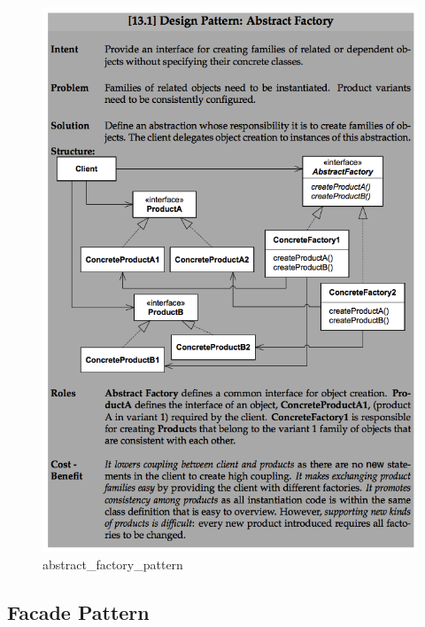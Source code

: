 \documentclass[11pt]{article}
\makeatletter
\def\maxwidth{\ifdim\Gin@nat@width>\linewidth\linewidth
    \else\Gin@nat@width\fi}
\let\Oldincludegraphics\includegraphics
\renewcommand{\includegraphics}[1]{\Oldincludegraphics[width=.8\maxwidth]{#1}}
\makeatother
\begin{document}
\begin{figure}
\centering
\includegraphics{img/abstract_factory_pattern.png}
\caption{abstract\_factory\_pattern}
\end{figure}

\hypertarget{facade-pattern}{%
\subsection{Facade Pattern}\label{facade-pattern}}
\end{document}
